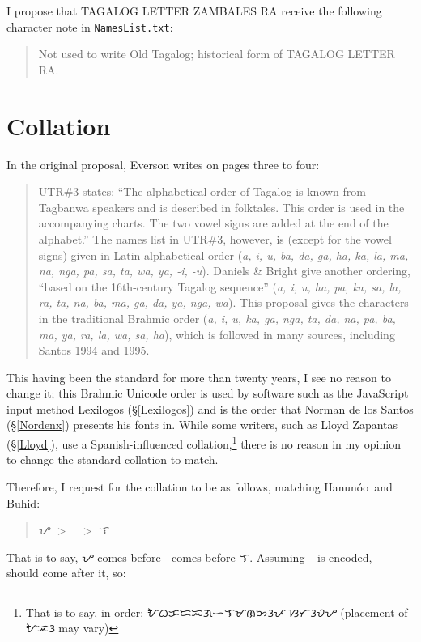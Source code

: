 \documentclass[a4paper,pagesize,openany,14pt,parskip=never]{scrbook}
\newcommand{\≈}{$\approx$}
\newcommand{\ra}{{\baybayin ᜍ}}
\newcommand{\hanunoo}{Hanun\'o\textquotesingle o}
\begin{document}
I propose that \textsf{TAGALOG LETTER ZAMBALES RA} receive the following character note in \texttt{NamesList.txt}:

\begin{quote}
    Not used to write Old Tagalog; historical form of TAGALOG LETTER RA.
\end{quote}

\section{Collation}

In the original proposal, Everson writes on pages three to four:

\begin{quote}
    UTR\#3 states: “The alphabetical order of Tagalog is known from Tagbanwa speakers and is described in folktales. This order is used in the accompanying charts. The two vowel signs are added at the end of the alphabet.” The names list in UTR\#3, however, is (except for the vowel signs) given in Latin alphabetical order ({\em a, i, u, ba, da, ga, ha, ka, la, ma, na, nga, pa, sa, ta, wa, ya, -i, -u}). Daniels \& Bright give another ordering, “based on the 16th-century Tagalog sequence” ({\em a, i, u, ha, pa, ka, sa, la, ra, ta, na, ba, ma, ga, da, ya, nga, wa}). This proposal gives the characters in the traditional Brahmic order ({\em a, i, u, ka, ga, nga, ta, da, na, pa, ba, ma, ya, ra, la, wa, sa, ha}), which is followed in many sources, including Santos 1994 and 1995.
\end{quote}

This having been the standard for more than twenty years, I see no reason to change it; this Brahmic Unicode order is used by software such as the JavaScript input method Lexilogos (\S\ref{Lexilogos}) and is the order that Norman de los Santos (\S\ref{Nordenx}) presents his fonts in. While some writers, such as Lloyd Zapantas (\S\ref{Lloyd}), use a Spanish-influenced collation,\footnote{That is to say, in order: {\baybayin ᜀᜊᜃᜇᜁᜄᜑᜎᜋᜈᜅᜂᜉᜍᜐᜆᜂᜏᜌ} (placement of {\baybayin ᜀᜁᜂ} may vary)} there is no reason in my opinion to change the standard collation to match.

Therefore, I request for the collation to be as follows, matching \hanunoo\ and Buhid:

\begin{quote}
    {\baybayin ᜌ} $>$ {\baybayin ᜍ} $>$ {\baybayin ᜎ}
\end{quote}

That is to say, {\baybayin ᜌ} comes before {\baybayin ᜍ} comes before {\baybayin ᜎ}. Assuming \ra\ is encoded, {\baybayinh ᜍ} should come after it, so:
\end{document}
